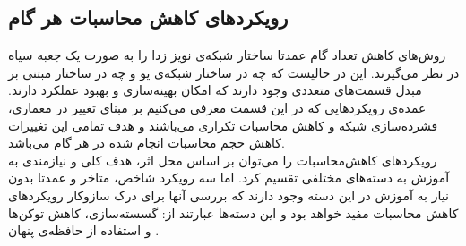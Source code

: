 \subsection{رویکرد‌های کاهش محاسبات هر گام}
روش‌های کاهش تعداد گام عمدتا ساختار شبکه‌ی نویز زدا را به صورت یک جعبه سیاه در نظر می‌گیرند. این در حالیست که چه در ساختار شبکه‌ی یو و چه در ساختار مبتنی بر مبدل قسمت‌های متعددی وجود دارند که امکان بهینه‌سازی و بهبود عملکرد دارند\cite{wimbauer2024cache}. عمده‌ی رویکرد‌هایی که در این قسمت معرفی می‌کنیم بر مبنای تغییر در معماری، فشرده‌سازی شبکه و کاهش محاسبات تکراری می‌باشند و هدف تمامی این تغییرات کاهش حجم محاسبات انجام شده در هر گام می‌باشد.
\\
رویکرد‌های کاهش‌محاسبات را می‌توان بر اساس محل اثر، هدف کلی و نیازمندی به آموزش به دسته‌های مختلفی تقسیم کرد. اما سه رویکرد شاخص، متاخر و عمدتا بدون نیاز به آموزش در این دسته وجود دارند که بررسی آنها برای درک سازوکار رویکرد‌های کاهش محاسبات مفید خواهد بود و این دسته‌ها عبارتند از: گسسته‌سازی، کاهش توکن‌ها و استفاده از حافظه‌ی پنهان \cite{pan2024t}.
\\
